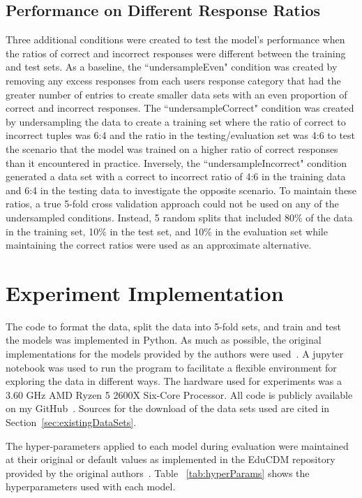 \documentclass[letterpaper, 12pt, captions=tableabove]{scrreprt}
\begin{document}
		\subsection{Performance on Different Response Ratios}
		\label{sub:performanceonSampledDataSets}
			Three additional conditions were created to test the model's performance when the ratios of correct and incorrect responses were different between the training and test sets. As a baseline, the ``undersampleEven" condition was created by removing any excess responses from each users response category that had the greater number of entries to create smaller data sets with an even proportion of correct and incorrect responses. The ``undersampleCorrect" condition was created by undersampling the data to create a training set where the ratio of correct to incorrect tuples was 6:4 and the ratio in the testing/evaluation set was 4:6 to test the scenario that the model was trained on a higher ratio of correct responses than it encountered in practice. Inversely, the ``undersampleIncorrect" condition generated a data set with a correct to incorrect ratio of 4:6 in the training data and 6:4 in the testing data to investigate the opposite scenario. To maintain these ratios, a true 5-fold cross validation approach could not be used on any of the undersampled conditions. Instead, 5 random splits that included 80\% of the data in the training set, 10\% in the test set, and 10\% in the evaluation set while maintaining the correct ratios were used as an approximate alternative.

	\section{Experiment Implementation}
	\label{sec:experimentImplementation}

		The code to format the data, split the data into 5-fold sets, and train and test the models was implemented in Python.  As much as possible, the original implementations for the models provided by the authors were used~\cite{bigdata2021}. A jupyter notebook was used to run the program to facilitate a flexible environment for exploring the data in different ways. The hardware used for experiments was a 3.60 GHz AMD Ryzen 5 2600X Six-Core Processor. All code is publicly available on my GitHub~\cite{toussaint2024}. Sources for the download of the data sets used are cited in Section~\ref{sec:existingDataSets}.
		
		The hyper-parameters applied to each model during evaluation were maintained at their original or default values as implemented in the EduCDM repository provided by the original authors~\cite{bigdata2021}.  Table ~\ref{tab:hyperParams} shows the hyperparameters used with each model.
\end{document}
